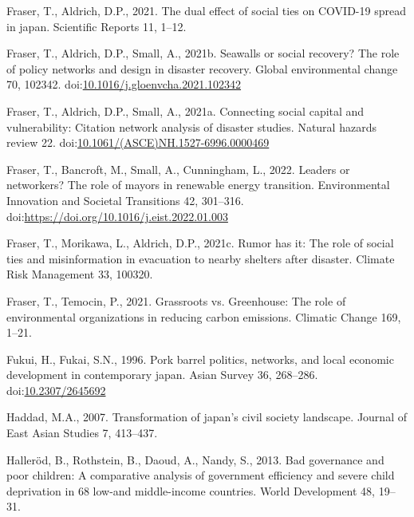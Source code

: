 \documentclass[]{elsarticle} %
\newlength{\cslhangindent}
\newlength{\cslentryspacingunit} %
\newenvironment{CSLReferences}[2] %
 {%
  \setlength{\parindent}{0pt}
  \ifodd #1
  \let\oldpar\par
  \def\par{\hangindent=\cslhangindent\oldpar}
  \fi
  \setlength{\parskip}{#2\cslentryspacingunit}
 }%
 {}
\begin{document}
\begin{CSLReferences}{1}{0}
\leavevmode{}%
Fraser, T., Aldrich, D.P., 2021. The dual effect of social ties on
COVID-19 spread in japan. Scientific Reports 11, 1--12.

\leavevmode{}%
Fraser, T., Aldrich, D.P., Small, A., 2021b. Seawalls or social
recovery? The role of policy networks and design in disaster recovery.
Global environmental change 70, 102342.
doi:\href{https://doi.org/10.1016/j.gloenvcha.2021.102342}{10.1016/j.gloenvcha.2021.102342}

\leavevmode{}%
Fraser, T., Aldrich, D.P., Small, A., 2021a. Connecting social capital
and vulnerability: Citation network analysis of disaster studies.
Natural hazards review 22.
doi:\href{https://doi.org/10.1061/(ASCE)NH.1527-6996.0000469}{10.1061/(ASCE)NH.1527-6996.0000469}

\leavevmode{}%
Fraser, T., Bancroft, M., Small, A., Cunningham, L., 2022. Leaders or
networkers? The role of mayors in renewable energy transition.
Environmental Innovation and Societal Transitions 42, 301--316.
doi:\url{https://doi.org/10.1016/j.eist.2022.01.003}

\leavevmode{}%
Fraser, T., Morikawa, L., Aldrich, D.P., 2021c. Rumor has it: The role
of social ties and misinformation in evacuation to nearby shelters after
disaster. Climate Risk Management 33, 100320.

\leavevmode{}%
Fraser, T., Temocin, P., 2021. Grassroots vs. Greenhouse: The role of
environmental organizations in reducing carbon emissions. Climatic
Change 169, 1--21.

\leavevmode{}%
Fukui, H., Fukai, S.N., 1996. Pork barrel politics, networks, and local
economic development in contemporary japan. Asian Survey 36, 268--286.
doi:\href{https://doi.org/10.2307/2645692}{10.2307/2645692}

\leavevmode{}%
Haddad, M.A., 2007. Transformation of japan's civil society landscape.
Journal of East Asian Studies 7, 413--437.

\leavevmode{}%
Halleröd, B., Rothstein, B., Daoud, A., Nandy, S., 2013. Bad governance
and poor children: A comparative analysis of government efficiency and
severe child deprivation in 68 low-and middle-income countries. World
Development 48, 19--31.


\end{CSLReferences}
\end{document}
